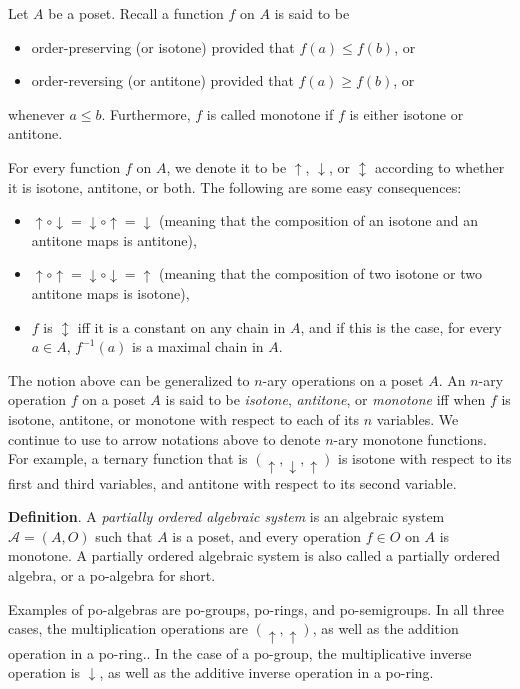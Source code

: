 \documentclass[12pt]{article}
\begin{document}
Let $A$ be a poset.  Recall a function $f$ on $A$ is said to be 
\begin{itemize}
\item order-preserving (or isotone) provided that $f(a)\le f(b)$, or 
\item order-reversing (or antitone) provided that $f(a)\ge f(b)$, or
\end{itemize}
whenever $a\le b$.  Furthermore, $f$ is called monotone if $f$ is either isotone or antitone.  

For every function $f$ on $A$, we denote it to be $\uparrow$, $\downarrow$, or $\updownarrow$ according to whether it is isotone, antitone, or both.  The following are some easy consequences:
\begin{itemize}
\item $\uparrow \circ \downarrow = \downarrow \circ \uparrow = \downarrow$ (meaning that the composition of an isotone and an antitone maps is antitone), 
\item $\uparrow \circ \uparrow = \downarrow \circ \downarrow = \uparrow$ (meaning that the composition of two isotone or two antitone maps is isotone),
\item $f$ is $\updownarrow$ iff it is a constant on any chain in $A$, and if this is the case, for every $a\in A$, $f^{-1}(a)$ is a maximal chain in $A$.
\end{itemize}

The notion above can be generalized to $n$-ary operations on a poset $A$.  An $n$-ary operation $f$ on a poset $A$ is said to be \emph{isotone}, \emph{antitone}, or \emph{monotone} iff when $f$ is isotone, antitone, or monotone with respect to each of its $n$ variables.  We continue to use to arrow notations above to denote $n$-ary monotone functions.  For example, a ternary function that is $(\uparrow,\downarrow,\uparrow)$ is isotone with respect to its first and third variables, and antitone with respect to its second variable.

\textbf{Definition}.  A \emph{partially ordered algebraic system} is an algebraic system $\mathcal{A}=(A,O)$ such that $A$ is a poset, and every operation $f \in O$ on $A$ is monotone.  A partially ordered algebraic system is also called a partially ordered algebra, or a po-algebra for short.

Examples of po-algebras are po-groups, po-rings, and po-semigroups.  In all three cases, the multiplication operations are $(\uparrow,\uparrow)$, as well as the addition operation in a po-ring..  In the case of a po-group, the 
multiplicative inverse operation is $\downarrow$, as well as the additive inverse operation in a po-ring.
\end{document}
